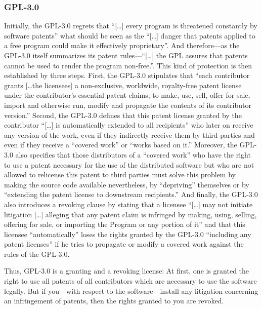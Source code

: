 \subsubsection{GPL-3.0}

Initially, the GPL-3.0 regrets that \enquote{[\ldots] every program is
threatened constantly by software patents} what should be seen as the
\enquote{[\ldots] danger that patents applied to a free program could make it
effectively proprietary}. And therefore---as the GPL-3.0 itself summarizes its
patent rules---\enquote{[\ldots] the GPL assures that patents cannot be used to
render the program non-free.}. This kind of protection is
then established by three steps. First, the GPL-3.0 stipulates that
\enquote{each contributor grants [\ldots the licensees] a non-exclusive,
worldwide, royalty-free patent license under the contributor's essential patent
claims, to make, use, sell, offer for sale, import and otherwise run, modify and
propagate the contents of its contributor version.}
Second, the GPL-3.0 defines that this patent license granted by the contributor
\enquote{[\ldots] is automatically extended to all recipients} who later on
receive any version of the work, even if they indirectly receive them by third
parties and even if they receive a \enquote{covered work} or \enquote{works
based on it.} Moreover, the GPL-3.0 also specifies that those
distributors of a \enquote{covered work} who have the right to use a patent
necessary for the use of the distributed software but who are not allowed to
relicense this patent to third parties must solve this problem by making the
source code available nevertheless, by \enquote{depriving} themselves or by
\enquote{extending the patent license to downstream recipients.} 
And finally, the GPL-3.0 also introduces a revoking clause by stating that a
licensee \enquote{[\ldots] may not initiate litigation [\ldots] alleging that
any patent claim is infringed by making, using, selling, offering for sale, or
importing the Program or any portion of it} and that this
licensee \enquote{automatically} loses the rights granted by the GPL-3.0
\enquote{including any patent licenses} if he tries to propagate or modify a
covered work against the rules of the GPL-3.0.

Thus, GPL-3.0 is a granting and a revoking license: At first, one is granted the
right to use all patents of all contributors which are necessary to use the
software legally. But if you---with respect to the software---install any
litigation concerning an infringement of patents, then the rights granted to you
are revoked. 


